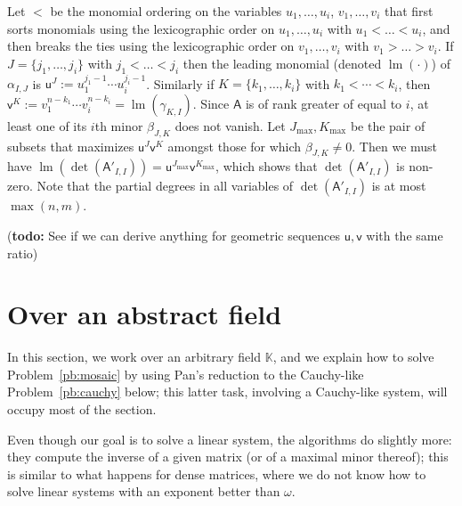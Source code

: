 \documentclass{sig-alternate}
\newcommand{\vu}{\ensuremath{\mathsf{u}}}
\newcommand{\vv}{\ensuremath{\mathsf{v}}}
\newcommand{\mA}{\ensuremath{\mathsf{A}}}
\newcommand{\K}{\ensuremath{\mathbb{K}}}
\newcommand{\lm}{\ensuremath{\operatorname{lm}}}
\newcommand{\todo}[1]{(\textbf{todo:} #1)}
\begin{document}
Let $<$ be the monomial ordering on the variables $u_1,\dots,u_i$,
$v_1,\dots,v_i$ that first sorts monomials using the lexicographic order on
$u_1,\dots,u_i$ with $u_1 < \dots < u_i$, and then breaks the ties using the
lexicographic order on $v_1,\dots,v_i$ with $v_1 > \dots > v_i$. If
$J=\{j_1,\dots,j_i\}$ with $j_1 < \dots < j_i$ then the leading monomial
(denoted $\lm(\cdot)$) of $\alpha_{I,J}$ is
$\vu^J := u_1^{j_1-1} \cdots u_i^{j_i-1}$.  Similarly if $K=\{k_1,\dots,k_i\}$
with $k_1 < \cdots < k_i$, then
$\vv^K := v_1^{n-k_1} \cdots v_i^{n-k_i}=\lm(\gamma_{K,I})$. Since $\mA$ is of
rank greater of equal to $i$, at least one of its $i$th minor $\beta_{J,K}$ does
not vanish. Let $J_{\max},K_{\max}$ be the pair of subsets that maximizes
$\vu^J \vv^K$ amongst those for which $\beta_{J,K} \neq 0$. Then we must have
$\lm(\det(\mA'_{I,I})) = \vu^{J_{\max}} \vv^{K_{\max}}$, which shows that
$\det(\mA'_{I,I})$ is non-zero. Note that the partial degrees in all variables
of $\det(\mA'_{I,I})$ is at most $\max(n,m)$. 

\todo{See if we can derive anything for geometric sequences $\vu, \vv$
  with the same ratio}


\section{Over an abstract field}\label{sec:abstract}

In this section, we work over an arbitrary field $\K$, and we explain
how to solve Problem~\ref{pb:mosaic} by using Pan's reduction to the
Cauchy-like Problem~\ref{pb:cauchy} below; this latter task, involving
a Cauchy-like system, will occupy most of the section.

Even though our goal is to solve a linear system, the algorithms do
slightly more: they compute the inverse of a given matrix (or of a
maximal minor thereof); this is similar to what happens for dense
matrices, where we do not know how to solve linear systems with an
exponent better than $\omega$.
\end{document}
